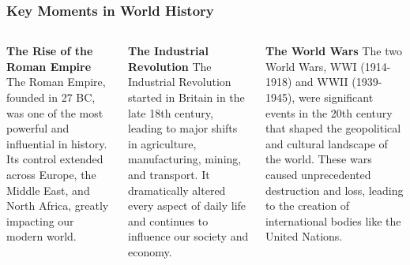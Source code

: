 \documentclass[5pt]{beamer}
\begin{document}
\begin{frame}
\frametitle{Key Moments in World History}
\begin{columns}
\begin{column}{0.3\textwidth}
\begin{block}{\textbf{The Rise of the Roman Empire}}
The Roman Empire, founded in 27 BC, was one of the most powerful and influential in history. Its control extended across Europe, the Middle East, and North Africa, greatly impacting our modern world.
\end{block}
\end{column}
\begin{column}{0.3\textwidth}
\begin{block}{\textbf{The Industrial Revolution}}
The Industrial Revolution started in Britain in the late 18th century, leading to major shifts in agriculture, manufacturing, mining, and transport. It dramatically altered every aspect of daily life and continues to influence our society and economy.
\end{block}
\end{column}
\begin{column}{0.3\textwidth}
\begin{block}{\textbf{The World Wars}}
The two World Wars, WWI (1914-1918) and WWII (1939-1945), were significant events in the 20th century that shaped the geopolitical and cultural landscape of the world. These wars caused unprecedented destruction and loss, leading to the creation of international bodies like the United Nations.
\end{block}
\end{column}
\end{columns}
\end{frame}
\end{document}
